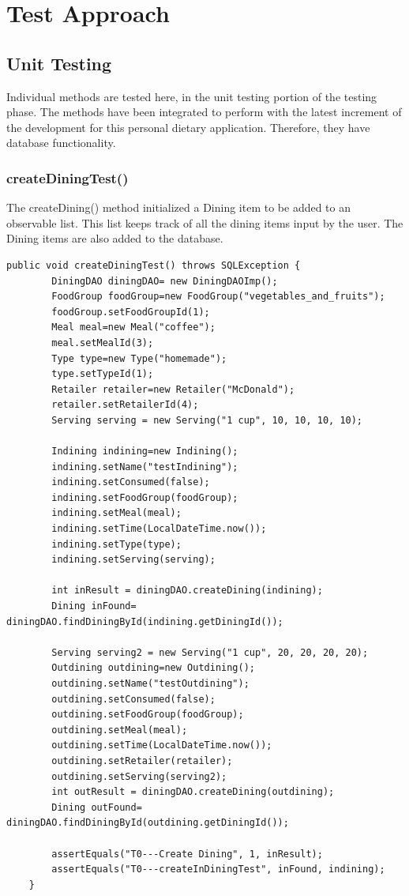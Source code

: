 \documentclass[table]{scrreprt}
\begin{document}
    \chapter{Test Approach}

    \section{Unit Testing}
    Individual methods are tested here, in the unit testing portion of the testing phase. The methods have been integrated to perform with the latest increment of the development for this personal dietary application. Therefore, they have database functionality.

    \subsection{createDiningTest()}
    The createDining() method initialized a Dining item to be added to an observable list. This list keeps track of all the dining items input by the user. The Dining items are also added to the database.
    \begin{verbatim}
public void createDiningTest() throws SQLException {
        DiningDAO diningDAO= new DiningDAOImp();
        FoodGroup foodGroup=new FoodGroup("vegetables_and_fruits");
        foodGroup.setFoodGroupId(1);
        Meal meal=new Meal("coffee");
        meal.setMealId(3);
        Type type=new Type("homemade");
        type.setTypeId(1);
        Retailer retailer=new Retailer("McDonald");
        retailer.setRetailerId(4);
        Serving serving = new Serving("1 cup", 10, 10, 10, 10);

        Indining indining=new Indining();
        indining.setName("testIndining");
        indining.setConsumed(false);
        indining.setFoodGroup(foodGroup);
        indining.setMeal(meal);
        indining.setTime(LocalDateTime.now());
        indining.setType(type);
        indining.setServing(serving);

        int inResult = diningDAO.createDining(indining);
        Dining inFound= diningDAO.findDiningById(indining.getDiningId());

        Serving serving2 = new Serving("1 cup", 20, 20, 20, 20);
        Outdining outdining=new Outdining();
        outdining.setName("testOutdining");
        outdining.setConsumed(false);
        outdining.setFoodGroup(foodGroup);
        outdining.setMeal(meal);
        outdining.setTime(LocalDateTime.now());
        outdining.setRetailer(retailer);
        outdining.setServing(serving2);
        int outResult = diningDAO.createDining(outdining);
        Dining outFound= diningDAO.findDiningById(outdining.getDiningId());

        assertEquals("T0---Create Dining", 1, inResult);
        assertEquals("T0---createInDiningTest", inFound, indining);
    }

\end{verbatim}
\end{document}
